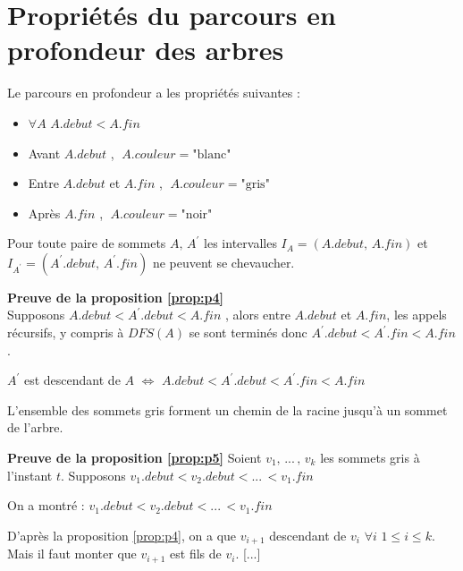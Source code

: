 \section{Propriétés du parcours en profondeur des arbres}

\begin{proposition}\label{prop:p3}
Le parcours en profondeur a les propriétés suivantes :
\begin{itemize}
\item $\forall A$ $A.debut < A.fin$
\item Avant $A.debut$ , $\;A.couleur = \text{"blanc"}$
\item Entre $A.debut$ et $A.fin$ , $\;A.couleur = \text{"gris"}$
\item Après $A.fin$ , $\;A.couleur = \text{"noir"}$
\end{itemize}

\end{proposition}

\begin{proposition}\label{prop:p4}
Pour toute paire de sommets $A,\, A^{\prime}$ les intervalles $I_{A} = (A.debut,\, A.fin)$ et $I_{A^{\prime}} = (A^{\prime}.debut,\, A^{\prime}.fin)$ ne peuvent se chevaucher.
\end{proposition}

\textbf{\sffamily\small Preuve de la proposition \ref{prop:p4}}\\
Supposons $A.debut < A^{\prime}.debut < A.fin$ , alors entre $A.debut$ et $A.fin$, les appels récursifs, y compris à $DFS(A)$ se sont terminés donc $A^{\prime}.debut < A^{\prime}.fin < A.fin$.

\begin{proposition}
$A^{\prime}$ est descendant de $A$ $\Leftrightarrow$ $A.debut < A^{\prime}.debut < A^{\prime}.fin < A.fin$
\end{proposition}

\begin{proposition}\label{prop:p5}
L'ensemble des sommets gris forment un chemin de la racine jusqu'à un sommet de l'arbre.
\end{proposition}

\textbf{\sffamily\small Preuve de la proposition \ref{prop:p5}}
Soient $v_{1},\, ...\, ,\, v_{k}$ les sommets gris à l'instant $t$. Supposons $v_{1}.debut < v_{2}.debut < ...\, < v_{1}.fin$

On a montré : $v_{1}.debut < v_{2}.debut < ...\, < v_{1}.fin$

D'après la proposition \ref{prop:p4}, on a que $v_{i+1}$ descendant de $v_{i}$ $\forall i$ $1 \leq i \leq k$. Mais il faut monter que $v_{i+1}$ est fils de $v_{i}$. [...]


